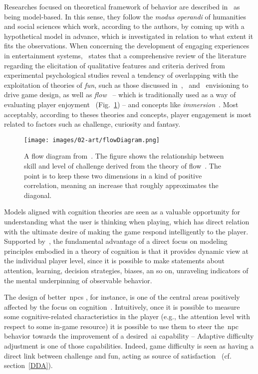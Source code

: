 Researches focused on theoretical framework of behavior are described in~\cite{yannakakis_player_2013} as being model-based. In this sense, they follow the \textit{modus operandi} of humanities and social sciences which work, according to the authors, by coming up with a hypothetical model in advance, which is investigated in relation to what extent it fits the observations. When concerning the development of engaging experiences in entertainment systems,~\cite{yannakakis_how_2008} states that a comprehensive review of the literature regarding the elicitation of qualitative features and criteria derived from experimental psychological studies reveal a tendency of overlapping with the exploitation of theories of \textit{fun}, such as those discussed in~\cite{malone_what_1980},~\cite{lazzaro_why_2004} and~\cite{koster_theory_2013} envisioning to drive game design, as well as \textit{flow}~\citep{csikszentmihalyi_flow:_1991} -- which is traditionally used as a way of evaluating player enjoyment~\citep{sweetser_gameflow:_2005, cowley_toward_2008} (Fig.~\ref{flowDiagram}) -- and concepts like \textit{immersion}~\citep{calleja_digital_2007}. Most acceptably, according to theses theories and concepts, player engagement is most related to factors such as challenge, curiosity and fantasy.

\begin{figure}[htp]
  \centering  
  \texttt{[image: images/02-art/flowDiagram.png]}
  \caption{A flow diagram from~\cite{hunicke_ai_2004}. The figure shows the relationship between skill and level of challenge derived from the theory of flow~\citep{csikszentmihalyi_flow:_1991}. The point is to keep these two dimensions in a kind of positive correlation, meaning an increase that roughly approximates the diagonal.}
   \label{flowDiagram}
\end{figure}

Models aligned with cognition theories are seen as a valuable opportunity for understanding what the user is thinking when playing, which has direct relation with the ultimate desire of making the game respond intelligently to the player. Supported by~\cite{bohil_cognitive_2007}, the fundamental advantage of a direct focus on modeling principles embodied in a theory of cognition is that it provides dynamic view at the individual player level, since it is possible to make statements about attention, learning, decision strategies, biases, an so on, unraveling indicators of the mental underpinning of observable behavior. 

The design of better~\gls{npc}s %
, for instance, is one of the central areas positively affected by the focus on cognition~\citep{funge_ai_1999}. Intuitively, once it is possible to measure some cognitive-related characteristics in the player (e.g., the attention level with respect to some in-game resource) it is possible to use them to steer the~\gls{npc} behavior towards the improvement of a desired~\gls{ai} capability -- Adaptive difficulty adjustment is one of those capabilities. Indeed, game difficulty is seen as having a direct link between challenge and fun, acting as source of satisfaction~\citep{koster_theory_2013,yannakakis_modeling_2006} (cf. section~\ref{DDA}). 

